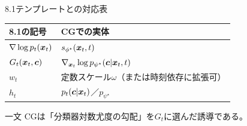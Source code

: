 \asmain
\begin{frame}{8.1テンプレートとの対応表}
    \begin{center}
    \renewcommand{\arraystretch}{1.25}
    \begin{tabular}{ll}
        \hline
        8.1の記号 & CGでの実体 \\
        \hline
        $\nabla\log p_t(\bm{x}_t)$ & $s_{\phi^\star}(\bm{x}_t,t)$ \\
        $G_t(\bm{x}_t,\bm{c})$ & $\nabla_{\bm{x}_t}\log p_{\psi^\star}(\bm{c}|\bm{x}_t,t)$ \\
        $w_t$ & 定数スケール$\omega$（または時刻依存に拡張可） \\
        $h_t$ & $p_t(\bm{c}|\bm{x}_t)$／$p_{\psi^\star}$ \\
        \hline
    \end{tabular}
    \end{center}
    \vspace{0.5em}
    \begin{block}{一文}
        CGは「分類器対数尤度の勾配」を$G_t$に選んだ誘導である。
    \end{block}
\end{frame}
